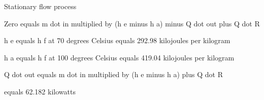 Stationary flow process  

Zero equals m dot in multiplied by (h e minus h a) minus Q dot out plus Q dot R  

h e equals h f at 70 degrees Celsius equals 292.98 kilojoules per kilogram  

h a equals h f at 100 degrees Celsius equals 419.04 kilojoules per kilogram  

Q dot out equals m dot in multiplied by (h e minus h a) plus Q dot R  

equals 62.182 kilowatts